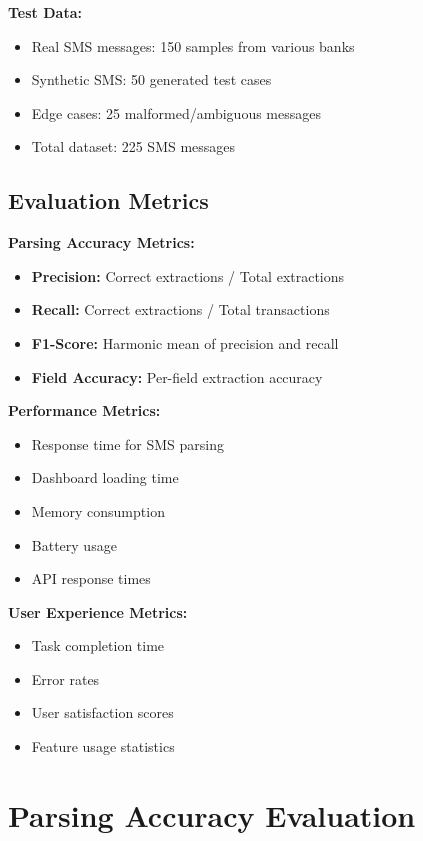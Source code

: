 \documentclass[11pt,a4paper]{report}
\begin{document}
\begin{itemize}
\begin{itemize}
\textbf{Test Data:}
\begin{itemize}
    \item Real SMS messages: 150 samples from various banks
    \item Synthetic SMS: 50 generated test cases
    \item Edge cases: 25 malformed/ambiguous messages
    \item Total dataset: 225 SMS messages
\end{itemize}

\subsection{Evaluation Metrics}

\textbf{Parsing Accuracy Metrics:}
\begin{itemize}
    \item \textbf{Precision:} Correct extractions / Total extractions
    \item \textbf{Recall:} Correct extractions / Total transactions
    \item \textbf{F1-Score:} Harmonic mean of precision and recall
    \item \textbf{Field Accuracy:} Per-field extraction accuracy
\end{itemize}

\textbf{Performance Metrics:}
\begin{itemize}
    \item Response time for SMS parsing
    \item Dashboard loading time
    \item Memory consumption
    \item Battery usage
    \item API response times
\end{itemize}

\textbf{User Experience Metrics:}
\begin{itemize}
    \item Task completion time
    \item Error rates
    \item User satisfaction scores
    \item Feature usage statistics
\end{itemize}

\section{Parsing Accuracy Evaluation}


\end{itemize}
\end{itemize}
\end{document}
